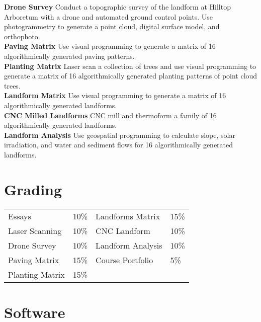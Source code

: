 \documentclass[11pt,article,oneside]{memoir}
\begin{document}
\noindent \textbf{Drone Survey}
Conduct a topographic survey 
of the landform at Hilltop Arboretum
with a drone and automated ground control points. 
Use photogrammetry to generate a point cloud, 
digital surface model, and orthophoto.
\\

\noindent \textbf{Paving Matrix}
Use visual programming to generate
a matrix of 16 algorithmically generated paving patterns.
\\

\noindent \textbf{Planting Matrix}
 Laser scan a collection of trees
 and use visual programming to generate
a matrix of 16 algorithmically generated planting patterns
of point cloud trees.
\\

\noindent \textbf{Landform Matrix}
Use visual programming to generate
a matrix of 16 algorithmically generated landforms.
\\

\noindent \textbf{CNC Milled Landforms}
CNC mill and thermoform a family of  16 algorithmically generated landforms.
\\

\noindent \textbf{Landform Analysis}
Use geospatial programming to 
calculate slope, solar irradiation,
and water and sediment flows
for 16 algorithmically generated landforms.
\\

\section{Grading}
%
\begin{table}[H]
\begin{tabular}{l r @{\hskip 2cm} l @{\hskip 0.5cm} l}
%
Essays & 10\% &  Landforms Matrix & 15\% \\
Laser Scanning & 10\% & CNC Landform & 10\%\\
Drone Survey & 10\% & Landform Analysis & 10\% \\
Paving Matrix & 15\% & Course Portfolio & 5\%\\ 
Planting Matrix & 15\%\\ 
%
\end{tabular}
\end{table}

\section{Software}
\end{document}
